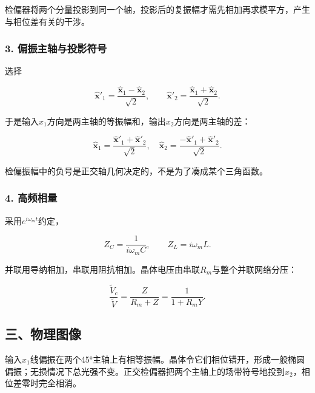 \documentclass[12pt,a4paper,fontset=fandol]{ctexart}
\begin{document}
检偏器将两个分量投影到同一个轴，投影后的复振幅才需先相加再求模平方，产生与相位差有关的干涉。

\subsubsection{3.
偏振主轴与投影符号}\label{ux504fux632fux4e3bux8f74ux4e0eux6295ux5f71ux7b26ux53f7}

选择

\[
\hat{\mathbf x}'_1=
\frac{\hat{\mathbf x}_1-\hat{\mathbf x}_2}{\sqrt2},
\qquad
\hat{\mathbf x}'_2=
\frac{\hat{\mathbf x}_1+\hat{\mathbf x}_2}{\sqrt2}.
\]

于是输入\(x_1\)方向是两主轴的等振幅和，输出\(x_2\)方向是两主轴的差：

\[
\hat{\mathbf x}_1=\frac{\hat{\mathbf x}'_1+\hat{\mathbf x}'_2}{\sqrt2},
\quad
\hat{\mathbf x}_2=\frac{-\hat{\mathbf x}'_1+\hat{\mathbf x}'_2}{\sqrt2}.
\]

检偏振幅中的负号是正交轴几何决定的，不是为了凑成某个三角函数。

\subsubsection{4. 高频相量}\label{ux9ad8ux9891ux76f8ux91cf}

采用\(e^{i\omega_mt}\)约定，

\[
Z_C=\frac1{i\omega_mC},\qquad Z_L=i\omega_mL.
\]

并联用导纳相加，串联用阻抗相加。晶体电压由串联\(R_m\)与整个并联网络分压：

\[
\frac{\widetilde V_c}{\widetilde V}
=\frac Z{R_m+Z}
=\frac1{1+R_mY}.
\]

\subsection{三、物理图像}\label{ux4e09ux7269ux7406ux56feux50cf-7}

输入\(x_1\)线偏振在两个45°主轴上有相等振幅。晶体令它们相位错开，形成一般椭圆偏振；无损情况下总光强不变。正交检偏器把两个主轴上的场带符号地投到\(x_2\)，相位差零时完全相消。
\end{document}
